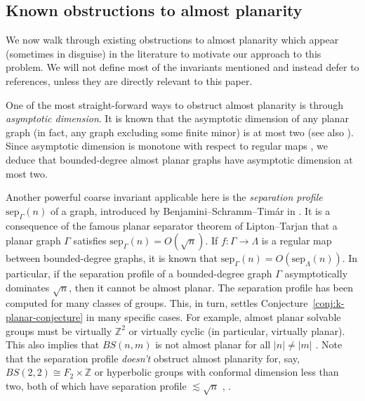 \documentclass[11pt,a4paper]{amsart}
\newcommand{\Z}{\mathbb{Z}}
\newtheorem{alphtheorem}{Theorem}
\theoremstyle{definition}
\begin{document}



\subsection{Known obstructions to almost planarity}\label{sec:intro-obsrtuctions}

We now walk through existing obstructions to almost planarity which appear (sometimes in disguise) in the literature to motivate our approach to this problem. We will not define most of the invariants mentioned and instead defer to references, unless they are directly relevant to this paper. 

One of the most straight-forward ways to obstruct almost planarity is through \emph{asymptotic dimension}. It is known that the asymptotic dimension of any planar graph (in fact, any graph excluding some finite minor) is at most two \cite{bonamy2023asymptotic} (see also \cite{fujiwara2021asymptotic, jorgensen2022geodesic}). Since asymptotic dimension is monotone with respect to regular maps \cite{benjamini2012separation}, we deduce that bounded-degree almost planar graphs have asymptotic dimension at most two.

Another powerful coarse invariant applicable here is the \emph{separation profile} $\mathrm{sep}_\Gamma(n)$ of a graph, introduced by Benjamini--Schramm--Tim\'ar in \cite{benjamini2012separation}. It is a consequence of the famous planar separator theorem of Lipton--Tarjan \cite{lipton1979separator} that a planar graph $\Gamma$ satisfies $\mathrm{sep}_\Gamma(n) = O(\sqrt n)$. If $f : \Gamma \to \Lambda$ is a regular map between bounded-degree graphs, it is known that $\mathrm{sep}_\Gamma(n) = O(\mathrm{sep}_\Lambda(n) )$. In particular, if the separation profile of a bounded-degree graph $\Gamma$ asymptotically dominates $\sqrt n$, then it cannot be almost planar. The separation profile has been computed for many classes of groups. This, in turn, settles Conjecture~\ref{conj:k-planar-conjecture} in many specific cases. For example, almost planar solvable groups must be virtually $\Z^2$ or virtually cyclic \cite{hume2020poincare, gournay2023separation} (in particular, virtually planar). This also implies that $BS(n, m)$ is not almost planar for all $|n| \neq |m|$ \cite{hume2022poincare}. Note that the separation profile \emph{doesn't} obstruct almost planarity for, say, $BS(2,2) \cong F_2 \times \Z$ or hyperbolic groups with conformal dimension less than two, both of which have separation profile $\lesssim \sqrt{n}$ \cite[Lem.~7.2]{benjamini1996harmonic}, \cite{hume2022poincare}.
\end{document}
